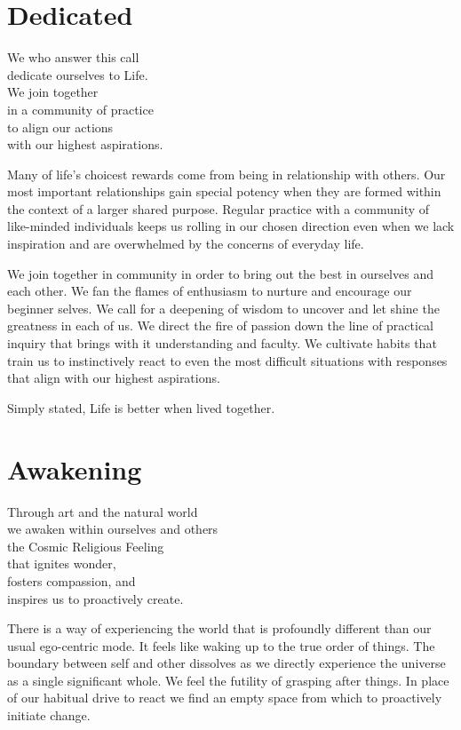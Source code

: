 \documentclass[ebook,12pt,openany,twoside]{memoir}
\newcommand{\tab}{\hspace*{2em}}
\newcommand{\imagefacingchapter}[1]{
  \cleartoverso
  \clearpage \null
  \thispagestyle{cleared}
  \AddToShipoutPictureBG*{%
    \AtStockLowerLeft{%
      \texttt{[image: \#1]}
    }
  }
  \clearpage
}
\begin{document}
\imagefacingchapter{images/Dedicated}
\chapter{Dedicated}
\setlength\epigraphwidth{2.2in}
\epigraph{
  We who answer this call\\
  dedicate ourselves to Life.\\
  \tab We join together\\
  \tab in a community of practice\\
  \tab to align our actions\\
  \tab with our highest aspirations.
}{}

\noindent Many of life's choicest rewards come from being in relationship with
others. Our most important relationships gain special potency when they are
formed within the context of a larger shared purpose. Regular practice with a
community of like-minded individuals keeps us rolling in our chosen direction
even when we lack inspiration and are overwhelmed by the concerns of everyday
life.

We join together in community in order to bring out the best in ourselves and
each other. We fan the flames of enthusiasm to nurture and encourage our
beginner selves. We call for a deepening of wisdom to uncover and let shine the
greatness in each of us. We direct the fire of passion down the line of
practical inquiry that brings with it understanding and faculty. We cultivate
habits that train us to instinctively react to even the most difficult
situations with responses that align with our highest aspirations.

Simply stated, Life is better when lived together.



\imagefacingchapter{images/Awakening}
\chapter{Awakening}
\setlength\epigraphwidth{2.6in}
\epigraph{
  Through art and the natural world\\
  we awaken within ourselves and others\\
  \tab the Cosmic Religious Feeling\\
  \tab that ignites wonder,\\
  \tab fosters compassion, and\\
  \tab inspires us to proactively create.
}{}

There is a way of experiencing the world that is profoundly different than our
usual ego-centric mode. It feels like waking up to the true order of things.
The boundary between self and other dissolves as we directly experience the
universe as a single significant whole. We feel the futility of grasping after
things. In place of our habitual drive to react we find an empty space from
which to proactively initiate change.
\end{document}
